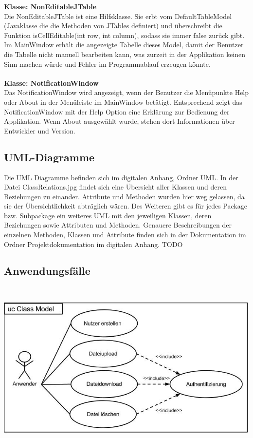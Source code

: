 \documentclass[13pt,a4paper,bibliography=totocnumbered,listof=totocnumbered]{scrartcl}
\begin{document}
\textbf{Klasse: NonEditableJTable}\\
Die NonEditableJTable ist eine Hilfsklasse. Sie erbt vom DefaultTableModel (Javaklasse die die Methoden von JTables definiert) und überschreibt die Funktion isCellEditable(int row, int column), sodass sie immer false zurück gibt. Im MainWindow erhält die angezeigte Tabelle dieses Model, damit der Benutzer die Tabelle nicht manuell bearbeiten kann, was zurzeit in der Applikation keinen Sinn machen würde und Fehler im Programmablauf erzeugen könnte.\\\\
\textbf{Klasse: NotificationWindow}\\
Das NotificationWindow wird angezeigt, wenn der Benutzer die Menüpunkte Help oder About in der Menüleiste im MainWindow betätigt. Entsprechend zeigt das NotificationWindow mit der Help Option eine Erklärung zur Bedienung der Applikation. Wenn About ausgewählt wurde, stehen dort Informationen über Entwickler und Version.


\subsection{UML-Diagramme}
Die UML Diagramme befinden sich im digitalen Anhang, Ordner UML. In der Datei ClassRelations.jpg findet sich eine Übersicht aller Klassen und deren Beziehungen zu einander. Attribute und Methoden wurden hier weg gelassen, da sie der Übersichtlichkeit abträglich wären. Des Weiteren gibt es für jedes Package bzw. Subpackage ein weiteres UML mit den jeweiligen Klassen, deren Beziehungen sowie Attributen und Methoden. Genauere Beschreibungen der einzelnen Methoden, Klassen und Attribute finden sich in der Dokumentation im Ordner Projektdokumentation im digitalen Anhang. TODO

\pagebreak

\subsection{Anwendungsfälle}
\vspace{0,5em}
$\;$\\
\begin{minipage}{\linewidth}
	\centering
	\includegraphics[width=0.8\linewidth]{./img/UseCase.jpg}
\end{minipage}
\vspace{0,em}
\end{document}
